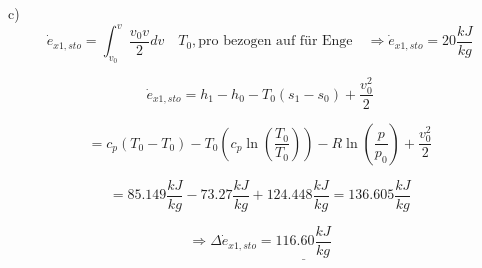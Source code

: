 c) 
\[
\dot{e}_{x1,sto} = \int_{v_0}^{v} \frac{v_0 v}{2} dv \quad T_0, \text{pro bezogen auf für Enge} \quad \Rightarrow \dot{e}_{x1,sto} = 20 \frac{kJ}{kg}
\]

\[
\dot{e}_{x1,sto} = h_1 - h_0 - T_0 (s_1 - s_0) + \frac{v_0^2}{2}
\]

\[
= c_p (T_0 - T_0) - T_0 \left( c_p \ln \left( \frac{T_0}{T_0} \right) \right) - R \ln \left( \frac{p}{p_0} \right) + \frac{v_0^2}{2}
\]

\[
= 85.149 \frac{kJ}{kg} - 73.27 \frac{kJ}{kg} + 124.448 \frac{kJ}{kg} = 136.605 \frac{kJ}{kg}
\]

\[
\Rightarrow \Delta \dot{e}_{x1,sto} = \underline{116.60 \frac{kJ}{kg}}
\]